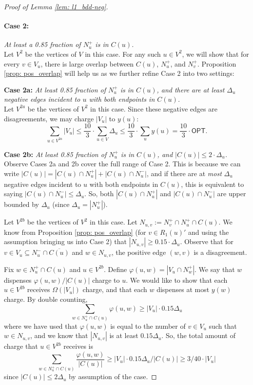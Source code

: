 \begin{proof}[Proof of Lemma \ref{lem: l1_bdd-neg}]
\paragraph{Case 2: }\emph{At least a 0.85 fraction of $N_u^+$ is in $C(u)$.} \\
Let $V^2$ be the vertices of $V$ in this case. 
For any such $u \in V^2$, we will show that for every $v \in V_u$, 
there is large overlap between $C(u)$, $N_u^+$, and $N_v^+$. 
Proposition \ref{prop: pos_overlap} will help us as we further refine Case 2 into two settings: 
\medskip

\noindent \textbf{Case 2a:} \emph{At least 0.85 fraction of $N_u^+$ is in $C(u)$, and there are at least $\Delta_u$ negative edges incident to $u$ with both endpoints in $C(u)$.}\\ 
Let $V^{2a}$ be the vertices of $V^2$ in this case. 
Since these negative edges are disagreements, we may charge $|V_u|$ to $y(u)$:
$$\boxed{\sum_{u \in V^{2a}} |V_u| \leq \frac{10}{3} \cdot \sum_{u \in V} \Delta_u \leq \frac{10}{3}\cdot \sum_u y(u) = \frac{10}{3} \cdot \textsf{OPT}.}$$

\noindent \textbf{Case 2b:} \emph{At least 0.85 fraction of $N_u^+$ is in $C(u)$, and $|C(u)| \leq 2 \cdot \Delta_u$.}\\
Observe Cases 2a and 2b cover the full range of Case 2. 
This is because we can write $|C(u)| = |C(u)\cap N_u^+| + |C(u)\cap N_u^-|$, 
and if there are at \emph{most} $\Delta_u$ negative edges incident to $u$ with both endpoints in $C(u)$, this is equivalent to saying $|C(u)\cap N_u^-| \leq \Delta_u$.
So, both $|C(u)\cap N_u^+|$ and $|C(u)\cap N_u^-|$ are upper bounded by $\Delta_u$ (since $\Delta_u = |N_u^+|$).

\smallskip

Let $V^{2b}$ be the vertices of $V^2$ in this case. 
Let $N_{u,v} := N_v^+ \cap N_u^+ \cap C(u)$. We know from Proposition \ref{prop: pos_overlap} (for $v \in R_1(u)'$ and using the assumption bringing us into Case 2) that $|N_{u,v}| \geq 0.15 \cdot \Delta_u$.  
Observe that for $v \in V_u \subseteq N_u^- \cap \overline{C(u)}$ 
and $w \in N_{u,v}$, the positive edge $(w,v)$ is a disagreement.

Fix $w \in N_u^+ \cap C(u)$ and $u \in V^{2b}$. Define $\varphi(u,w) = |V_u \cap N_w^+|$. We say that $w$ dispenses $\varphi(u,w)/|C(u)|$ charge to $u$. We would like to show that each $u \in V^{2b}$ receives $\Omega(|V_u|)$ charge, and that each $w$ dispenses at most $y(w)$ charge. By double counting,  
$$\sum_{w \in N_u^+ \cap C(u)} \varphi(u,w) \geq |V_u| \cdot 0.15\Delta_u $$
where we have used that $\varphi(u,w)$ is equal to the number of $v \in V_u$ such that $w \in N_{u,v}$, and we know that $|N_{u,v}|$ is at least $0.15 \Delta_u$. So, the total amount of charge that $u \in V^{2b}$ receives is 
$$\sum_{w \in N_u^+ \cap C(u)} \frac{\varphi(u,w)}{|C(u)|} \geq |V_u| \cdot 0.15 \Delta_u / |C(u)| \geq 3/40 \cdot |V_u|$$
since $|C(u)| \leq 2\Delta_u$ by assumption of the case. 


\end{proof}
